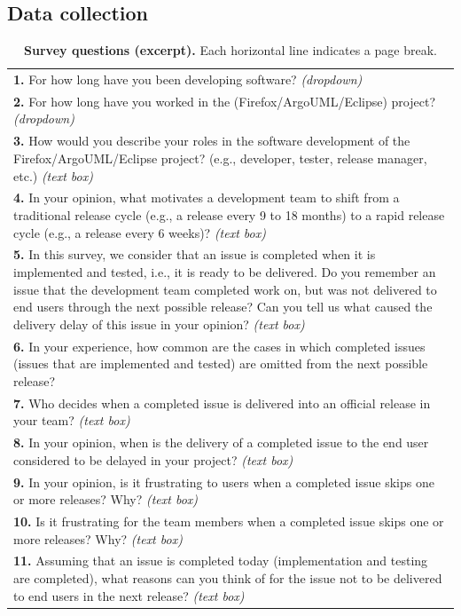 \subsection{Data collection}\label{ch5:datacollection2}

\begin{table}[t!]
	\centering
	\footnotesize
	\caption{\textbf{Survey questions (excerpt).} Each horizontal line indicates a page break.
	\label{tbl:survey}}
		\begin{tabular}{p{}}
			\hline 
			\textbf{1.} For how long have you been developing software? {\em (dropdown)}\tabularnewline
			\textbf{2.} For how long have you worked in the (Firefox/ArgoUML/Eclipse) project?
			{\em (dropdown)}\tabularnewline
			\textbf{3.} How would you describe your roles in the software development of
			the Firefox/ArgoUML/Eclipse project? (e.g., developer, tester, release manager, etc.)
			{\em (text box)}\tabularnewline
			\textbf{4.} In your opinion, what motivates a development team to shift from
			a traditional release cycle (e.g., a release every 9 to 18 months)
			to a rapid release cycle (e.g., a release every 6
			weeks)? {\em (text box)}\tabularnewline
			\textbf{5.} In this survey, we consider that an issue is completed when it
			is implemented and tested, i.e., it is ready to be delivered. Do
			you remember an issue that the development team completed work on,
			but was not delivered to end users through the next possible release?
			Can you tell us what caused the delivery delay of this issue in your
			opinion? {\em (text box)}\tabularnewline
			\textbf{6.} In your experience, how common are the cases in which completed
			issues (issues that are implemented and tested) are omitted from the
			next possible release?\tabularnewline
			\textbf{7.} Who decides when a completed issue is delivered into an official
			release in your team? {\em (text box)}\tabularnewline
			\textbf{8.} In your opinion, when is the delivery of a completed issue to the
			end user considered to be delayed in your project? {\em (text box)}\tabularnewline
			\hline 
			\textbf{9.} In your opinion, is it frustrating to users when a completed issue
			skips one or more releases? Why? {\em (text box)}\tabularnewline
			\textbf{10.} Is it frustrating for the team members when a completed issue
			skips one or more releases? Why? {\em (text box)}\tabularnewline
			\hline 
			\textbf{11.} Assuming that an issue is completed today (implementation and
			testing are completed), what reasons can you think of for the issue
			not to be delivered to end users in the next release? {\em (text box)}\tabularnewline

\end{tabular}
\end{table}
